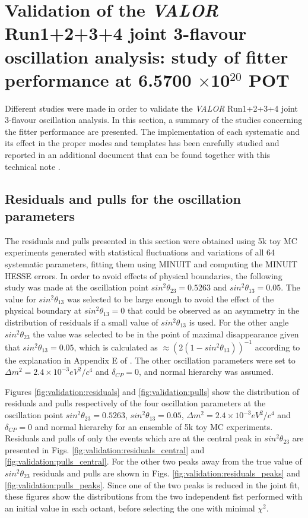 \clearpage

\section {Validation of the \textit{VALOR} Run1+2+3+4 joint 3-flavour oscillation analysis: study of fitter performance at 6.5700 $\times$10$^{20}$ POT}
\label{sec:validation}

Different studies were made in order to validate the \textit{VALOR} Run1+2+3+4 joint 3-flavour oscillation analysis. In this section, a summary of the studies concerning the fitter performance are presented. The implementation of each systematic and its effect in the proper modes and templates has been carefully studied and reported in an additional document that can be found together with this technical note \cite{AdditionalMaterial}.

\subsection{Residuals and pulls for the oscillation parameters}

The residuals and pulls presented in this section were obtained using 5k toy MC experiments generated with statistical fluctuations and variations of all 64 systematic parameters, fitting them using MINUIT and computing the MINUIT HESSE errors. In order to avoid effects of physical boundaries, the following study was made at the oscillation point $sin^{2}\theta_{23} = 0.5263$ and $sin^{2}\theta_{13} = 0.05$. The value for $sin^{2}\theta_{13}$ was selected to be large enough to avoid the effect of the physical boundary at $sin^{2}\theta_{13} = 0$ that could be observed as an asymmetry in the distribution of residuals if a small value of $sin^{2}\theta_{13}$ is used. For the other angle $sin^{2}\theta_{23}$ the value was selected to be in the point of maximal disappearance given that $sin^{2}\theta_{13} = 0.05$, which is calculated as $\approx (2(1-sin^{2}\theta_{13}))^{-1}$ according to the explanation in Appendix E of \cite{OurJointAnalysis}. The other oscillation parameters were set to $\Delta m^{2} = 2.4 \times 10^{-3} eV^{2}/c^{4}$ and $\delta_{CP} = 0$, and normal hierarchy was assumed. 

Figures \ref{fig:validation:residuals} and \ref{fig:validation:pulls} show the distribution of residuals and pulls respectively of the four oscillation parameters at the oscillation point $sin^{2}\theta_{23} = 0.5263$, $sin^{2}\theta_{13} = 0.05$, $\Delta m^{2} = 2.4 \times 10^{-3} eV^{2}/c^{4}$ and $\delta_{CP} = 0$ and normal hierarchy for an ensemble of 5k toy MC experiments. Residuals and pulls of only the events which are at the central peak in $sin^{2}\theta_{23}$ are presented in Figs. \ref{fig:validation:residuals_central} and \ref{fig:validation:pulls_central}. For the other two peaks away from the true value of $sin^{2}\theta_{23}$ residuals and pulls are shown in Figs. \ref{fig:validation:residuals_peaks} and \ref{fig:validation:pulls_peaks}. Since one of the two peaks is reduced in the joint fit, these figures show the distributions from the two independent fist performed with an initial value in each octant, before selecting the one with minimal $\chi^{2}$. 

